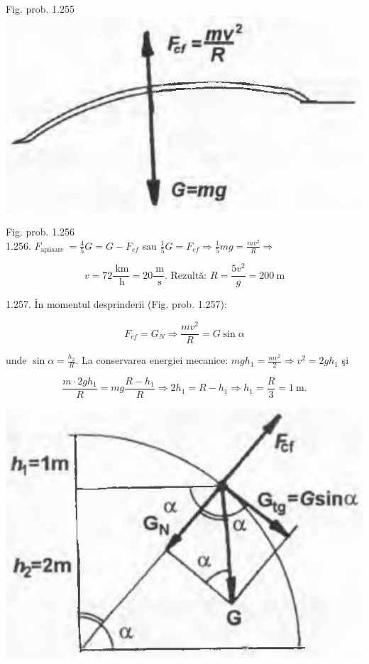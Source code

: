 \documentclass[10pt]{article}
\begin{document}
Fig. prob. 1.255\\
\includegraphics[max width=\textwidth, center]{2025_07_01_5b3ff9fa0d508c8e9f17g-253(1)}

Fig. prob. 1.256\\
1.256. $F_{\text {apäsare }}=\frac{4}{5} G=G-F_{c f}$ sau $\frac{1}{5} G=F_{c f} \Rightarrow \frac{1}{5} m g=\frac{m v^{2}}{R} \Rightarrow$

$$
v=72 \frac{\mathrm{~km}}{\mathrm{~h}}=20 \frac{\mathrm{~m}}{\mathrm{~s}} . \text { Rezultă: } R=\frac{5 v^{2}}{g}=200 \mathrm{~m}
$$

1.257. În momentul desprinderii (Fig. prob. 1.257):

$$
F_{c f}=G_{N} \Rightarrow \frac{m v^{2}}{R}=G \sin \alpha
$$

unde $\sin \alpha=\frac{h_{2}}{R}$. La conservarea energiei mecanice: $m g h_{1}=\frac{m v^{2}}{2} \Rightarrow v^{2}=2 g h_{1}$ şi

$$
\frac{m \cdot 2 g h_{1}}{R}=m g \frac{R-h_{1}}{R} \Rightarrow 2 h_{1}=R-h_{1} \Rightarrow h_{1}=\frac{R}{3}=1 \mathrm{~m} .
$$

\begin{center}
\includegraphics[max width=\textwidth]{2025_07_01_5b3ff9fa0d508c8e9f17g-253(3)}
\end{center}
\end{document}
